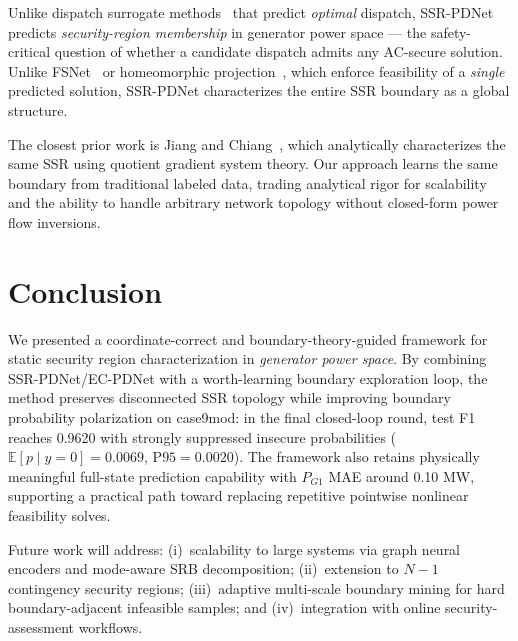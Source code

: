 \documentclass[journal]{IEEEtran}
\begin{document}
Unlike dispatch surrogate methods~\cite{pan2023deepopf} that predict \emph{optimal}
dispatch, SSR-PDNet predicts \emph{security-region membership} in generator power space —
the safety-critical question of whether a candidate dispatch admits any
AC-secure solution. Unlike FSNet~\cite{nguyen2025fsnet} or homeomorphic
projection~\cite{liang2023homeomorphic}, which enforce feasibility of a
\emph{single} predicted solution, SSR-PDNet characterizes the entire SSR boundary
as a global structure.

The closest prior work is Jiang and Chiang~\cite{jiang2017feasibility}, which
analytically characterizes the same SSR using quotient gradient system theory.
Our approach learns the same boundary from traditional labeled data, trading analytical rigor
for scalability and the ability to handle arbitrary network topology without
closed-form power flow inversions.

\section{Conclusion}
\label{sec:conclusion}

We presented a coordinate-correct and boundary-theory-guided framework for
static security region characterization in \emph{generator power space}.
By combining SSR-PDNet/EC-PDNet with a worth-learning boundary exploration
loop, the method preserves disconnected SSR topology while improving boundary
probability polarization on case9mod: in the final closed-loop round,
test F1 reaches 0.9620 with strongly suppressed insecure probabilities
($\mathbb{E}[p\mid y=0]=0.0069$, $\mathrm{P95}=0.0020$). The framework also
retains physically meaningful full-state prediction capability with
$P_{G1}$ MAE around 0.10 MW, supporting a practical path toward replacing
repetitive pointwise nonlinear feasibility solves.

Future work will address: (i)~scalability to large systems via graph neural
encoders and mode-aware SRB decomposition; (ii)~extension to $N{-}1$
contingency security regions; (iii)~adaptive multi-scale boundary mining for
hard boundary-adjacent infeasible samples; and (iv)~integration with online
security-assessment workflows.



\end{document}
